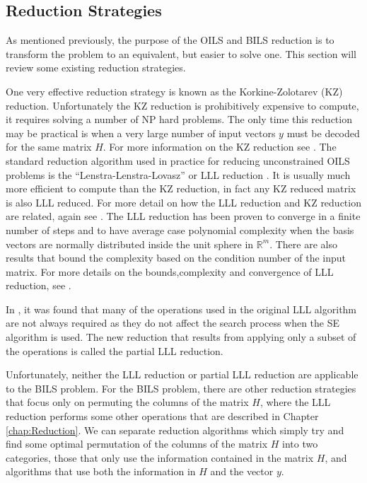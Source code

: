 \documentclass[12pt,Bold,letterpaper]{mcgilletdclass}
\newcommand{\vsp}{\vspace{\baselineskip}}
\begin{document}
\vsp \subsection{Reduction Strategies} \label{subsec:Reductions}

As mentioned previously, the purpose of the OILS and BILS reduction is to transform the problem to an equivalent, but easier to solve one. This section will review some existing reduction strategies.

One very effective reduction strategy is known as the Korkine-Zolotarev (KZ)
reduction. Unfortunately the KZ reduction is prohibitively expensive to compute,
it requires solving a number of NP hard problems. The only time this reduction
may be practical is when a very large number of input vectors $y$ must be
decoded for the same matrix $H$. For more information on the KZ reduction see
\cite{AgrEVZ02}. The standard reduction algorithm used in practice for reducing unconstrained OILS problems is the ``Lenstra-Lenstra-Lovasz'' or LLL
reduction \cite{LenLL82}. It is usually much more efficient to compute than the
KZ reduction, in fact any KZ reduced matrix is also LLL reduced. For more detail
on how the LLL reduction and KZ reduction are related, again see
\cite{AgrEVZ02}. The LLL reduction has been proven to converge in a finite
number of steps and to have average case polynomial complexity when the basis
vectors are normally distributed inside the unit sphere in $\mathbb{R}^m$. There
are also results that bound the complexity based on the condition number of the
input matrix. For more details on the bounds,complexity and convergence of LLL
reduction, see \cite{WubSJM11}.

In \cite{XieCB11}, it was found that many of the operations used in the original LLL algorithm are not always required as they do not affect the search process when the SE algorithm is used. The new reduction that results from applying only a subset of the operations is called the partial LLL reduction.

Unfortunately, neither the LLL reduction or partial LLL reduction are applicable to the BILS problem. For the BILS problem, there are other reduction strategies that focus only on permuting the columns of the matrix $H$, where the LLL reduction performs some other operations that are described in Chapter \ref{chap:Reduction}. We can separate reduction algorithms which simply try and find some optimal permutation of the columns of the matrix $H$ into two categories, those that only use the information contained in the matrix $H$, and algorithms that use both the information in $H$ and the vector $y$.
\end{document}
